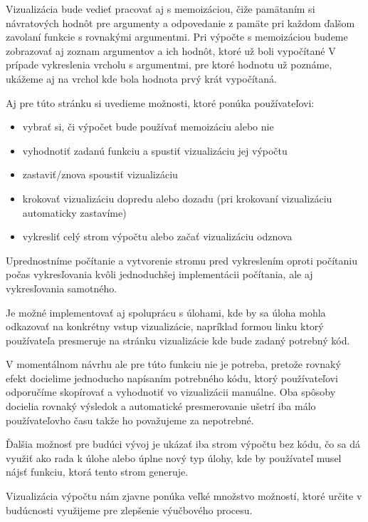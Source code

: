 Vizualizácia bude vedieť pracovať aj s memoizáciou, čiže pamätaním si návratových hodnôt pre
argumenty a odpovedanie z pamäte pri každom ďalšom zavolaní funkcie s rovnakými argumentmi.
Pri výpočte s memoizáciou budeme zobrazovať aj zoznam argumentov a ich hodnôt, ktoré už boli vypočítané
V prípade vykreslenia vrcholu s argumentmi, pre ktoré hodnotu už poznáme, ukážeme aj na vrchol
kde bola hodnota prvý krát vypočítaná.

Aj pre túto stránku si uvedieme možnosti, ktoré ponúka používateľovi:
\begin{itemize}
  \item vybrať si, či výpočet bude používať memoizáciu alebo nie
  \item vyhodnotiť zadanú funkciu a spustiť vizualizáciu jej výpočtu
  \item zastaviť/znova spoustiť vizualizáciu
  \item krokovať vizualizáciu dopredu alebo dozadu (pri krokovaní vizualizáciu
   automaticky zastavíme)
  \item vykresliť celý strom výpočtu alebo začať vizualizáciu odznova
\end{itemize}

Uprednostníme počítanie a vytvorenie stromu pred vykreslením oproti počítaniu počas vykresľovania
kvôli jednoduchšej implementácii počítania, ale aj vykresľovania samotného.

Je možné implementovať aj spoluprácu s úlohami, kde by sa úloha mohla odkazovať
na konkrétny vstup vizualizácie, napríklad formou linku ktorý používateľa presmeruje
na stránku vizualizácie kde bude zadaný potrebný kód.

V momentálnom návrhu ale pre túto funkciu nie je potreba, pretože rovnaký efekt docielime
jednoducho napísaním potrebného kódu, ktorý používateľovi odporučíme skopírovať
a vyhodnotiť vo vizualizácii manuálne. Oba spôsoby docielia rovnaký výsledok a
automatické presmerovanie ušetrí iba málo používateľovho času takže ho považujeme
za nepotrebné.

Ďalšia možnosť pre budúci vývoj je ukázať iba strom výpočtu bez kódu, čo sa dá
využiť ako rada k úlohe alebo úplne nový typ úlohy, kde by používateľ musel
nájsť funkciu, ktorá tento strom generuje.

Vizualizácia výpočtu nám zjavne ponúka veľké množstvo možností, ktoré určite v budúcnosti využijeme
pre zlepšenie výučbového procesu.
